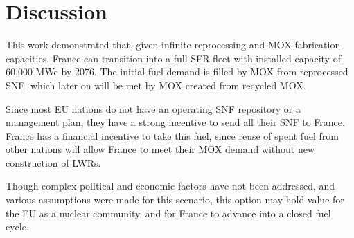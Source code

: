 \section{Discussion}
This work demonstrated that, given infinite
reprocessing and \gls{MOX} fabrication capacities,
France can transition into a full \gls{SFR} fleet
with installed capacity of 60,000 MWe by 2076.
The initial fuel demand is filled by \gls{MOX} from
reprocessed \gls{SNF}, which later on
will be met by \gls{MOX} created from recycled \gls{MOX}.

Since most \gls{EU} nations do not have an operating \gls{SNF}
repository or a management plan, they have a strong incentive
to send all their \gls{SNF} to France. France has a financial
incentive to take this fuel, since reuse of spent fuel from
other nations will allow France to meet their MOX demand
without new construction of \glspl{LWR}.

Though complex political and economic factors have not been
addressed, and various assumptions were made for this scenario,
this option may hold value for the \gls{EU} as a nuclear community,
and for France to advance into a closed fuel cycle.
